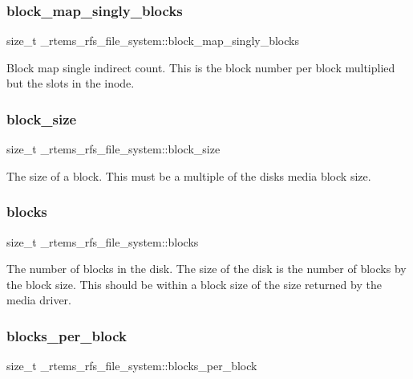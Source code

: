 \subsubsection{\texorpdfstring{block\_map\_singly\_blocks}{block\_map\_singly\_blocks}}
{\footnotesize\ttfamily size\+\_\+t \+\_\+rtems\+\_\+rfs\+\_\+file\+\_\+system\+::block\+\_\+map\+\_\+singly\+\_\+blocks}

Block map single indirect count. This is the block number per block multiplied but the slots in the inode. \mbox{\label{struct__rtems__rfs__file__system_ac34b3180a23364ae309ba9c0d5eece13}} 
\subsubsection{\texorpdfstring{block\_size}{block\_size}}
{\footnotesize\ttfamily size\+\_\+t \+\_\+rtems\+\_\+rfs\+\_\+file\+\_\+system\+::block\+\_\+size}

The size of a block. This must be a multiple of the disk\textquotesingle{}s media block size. \mbox{\label{struct__rtems__rfs__file__system_a7350984d3e2c1a22bc4063c26d37eec1}} 
\subsubsection{\texorpdfstring{blocks}{blocks}}
{\footnotesize\ttfamily size\+\_\+t \+\_\+rtems\+\_\+rfs\+\_\+file\+\_\+system\+::blocks}

The number of blocks in the disk. The size of the disk is the number of blocks by the block size. This should be within a block size of the size returned by the media driver. \mbox{\label{struct__rtems__rfs__file__system_a34201873b96a92c26ae78a1becfb0dcb}} 
\subsubsection{\texorpdfstring{blocks\_per\_block}{blocks\_per\_block}}
{\footnotesize\ttfamily size\+\_\+t \+\_\+rtems\+\_\+rfs\+\_\+file\+\_\+system\+::blocks\+\_\+per\+\_\+block}

